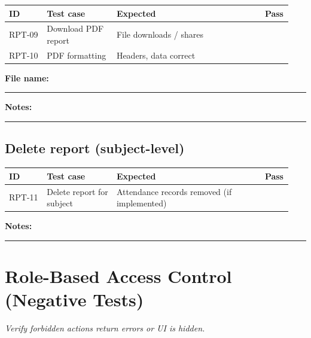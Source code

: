 \documentclass[11pt,a4paper,oneside]{article}
\newcommand{\chk}{\fbox{\rule{0pt}{1.05ex}\rule{1.05ex}{0pt}}}
\newcommand{\fillin}[1][3.5cm]{\rule{#1}{0.4pt}}
\newcommand{\fillinlong}{\rule{0.72\textwidth}{0.4pt}}
\newcommand{\notesblock}{\par\smallskip\noindent\textbf{Notes:}\ \fillinlong\par\smallskip}
\newcommand{\fieldline}[1]{\par\smallskip\noindent\textbf{#1}\ \fillin\par}
\newcommand{\tcheadfour}{%
  \toprule
  \textbf{ID} & \textbf{Test case} & \textbf{Expected} & \textbf{Pass} \\
  \midrule
}
\begin{document}
\small
\begin{tabular}{@{}>{\raggedright\arraybackslash}p{0.13\linewidth} >{\raggedright\arraybackslash}p{0.24\linewidth} >{\raggedright\arraybackslash}p{0.51\linewidth} >{\centering\arraybackslash}p{0.06\linewidth}@{}}
  \tcheadfour
  RPT-09 & Download PDF report  & File downloads / shares  & \chk \\
  RPT-10 & PDF formatting       & Headers, data correct    & \chk \\
  \bottomrule
\end{tabular}
\normalsize

\fieldline{File name:}
\notesblock

\subsection{Delete report (subject-level)}

\small
\begin{tabular}{@{}>{\raggedright\arraybackslash}p{0.13\linewidth} >{\raggedright\arraybackslash}p{0.24\linewidth} >{\raggedright\arraybackslash}p{0.51\linewidth} >{\centering\arraybackslash}p{0.06\linewidth}@{}}
  \tcheadfour
  RPT-11 & Delete report for subject & Attendance records removed (if implemented) & \chk \\
  \bottomrule
\end{tabular}
\normalsize

\notesblock

\section{Role-Based Access Control (Negative Tests)}

\noindent\textit{Verify forbidden actions return errors or UI is hidden.}
\end{document}
